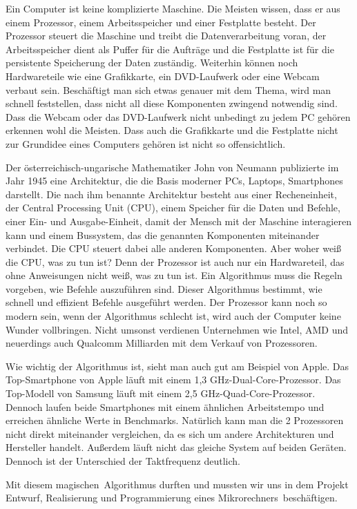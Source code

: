 Ein Computer ist keine komplizierte Maschine. Die Meisten wissen, dass er aus einem Prozessor, einem Arbeitsspeicher und einer Festplatte besteht. Der Prozessor steuert die Maschine und treibt die Datenverarbeitung voran, der Arbeitsspeicher dient als Puffer für die Aufträge und die Festplatte ist für die persistente Speicherung der Daten zuständig. Weiterhin können noch Hardwareteile wie eine Grafikkarte, ein DVD-Laufwerk oder eine Webcam verbaut sein.
Beschäftigt man sich etwas genauer mit dem Thema, wird man schnell feststellen, dass nicht all diese Komponenten zwingend notwendig sind. Dass die Webcam oder das DVD-Laufwerk nicht unbedingt zu jedem PC gehören erkennen wohl die Meisten. Dass auch die Grafikkarte und die Festplatte nicht zur Grundidee eines Computers gehören ist nicht so offensichtlich.

Der österreichisch-ungarische Mathematiker John von Neumann publizierte im Jahr 1945 eine Architektur, die die Basis moderner PCs, Laptops, Smartphones darstellt.
Die nach ihm benannte Architektur besteht aus einer Recheneinheit, der Central Processing Unit (CPU), einem Speicher für die Daten und Befehle, einer Ein- und Ausgabe-Einheit, damit der Mensch mit der Maschine interagieren kann und einem Bussystem, das die genannten Komponenten miteinander verbindet. Die CPU steuert dabei alle anderen Komponenten. Aber woher weiß die CPU, was zu tun ist? Denn der Prozessor ist auch nur ein Hardwareteil, das ohne Anweisungen nicht weiß, was zu tun ist. Ein Algorithmus muss die Regeln vorgeben, wie Befehle auszuführen sind. Dieser Algorithmus bestimmt, wie schnell und effizient Befehle ausgeführt werden. Der Prozessor kann noch so modern sein, wenn der Algorithmus schlecht ist, wird auch der Computer keine Wunder vollbringen. Nicht umsonst verdienen Unternehmen wie Intel, AMD und neuerdings auch Qualcomm Milliarden mit dem Verkauf von Prozessoren. 

Wie wichtig der Algorithmus ist, sieht man auch gut am Beispiel von Apple. Das Top-Smartphone von Apple läuft mit einem 1,3 GHz-Dual-Core-Prozessor. Das Top-Modell von Samsung läuft mit einem 2,5 GHz-Quad-Core-Prozessor. Dennoch laufen beide Smartphones mit einem ähnlichen Arbeitstempo und erreichen ähnliche Werte in Benchmarks. Natürlich kann man die 2 Prozessoren nicht direkt miteinander vergleichen, da es sich um andere Architekturen und Hersteller handelt. Außerdem läuft nicht das gleiche System auf beiden Geräten. Dennoch ist der Unterschied der Taktfrequenz deutlich.

Mit diesem \glqq magischen\grqq \ Algorithmus durften und mussten wir uns in dem Projekt \glqq Entwurf, Realisierung und Programmierung eines Mikrorechners\grqq \ beschäftigen. 

